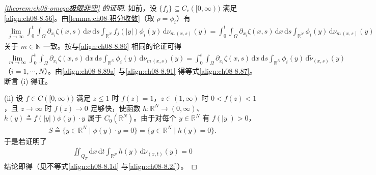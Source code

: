 \documentclass[../../main.tex]{subfiles}%
\begin{document}
\begin{proof}[\cref{theorem:ch08-omega极限非空} 的证明]
如前，设 $\{f_j\}\subseteq C_c([0,\infty))$ 满足\eqref{align:ch08-8.56}。由\cref{lemma:ch08-积分收敛}（取 $\rho=\phi_i$）有
\begin{align}
\lim_{j\to\infty}\int_0^t\int_\Omega\partial_{x_i}\zeta(x,s)\,\mathrm{d}x\,\mathrm{d}s\int_{\mathbb{R}^N}f_j(|y|)\phi_i(y)\,\mathrm{d}\nu_{m\,(x,s)}(y)
=\int_0^t\int_\Omega\partial_{x_i}\zeta(x,s)\,\mathrm{d}x\,\mathrm{d}s\int_{\mathbb{R}^N}\phi_i(y)\,\mathrm{d}\nu_{m\,(x,s)}(y) \label{align:ch08-8.90}
\end{align}
关于 $m\in\mathbb{N}$ 一致。按与\eqref{align:ch08-8.86} 相同的论证可得
\begin{align}
\lim_{m\to\infty}\int_0^t\int_\Omega\partial_{x_i}\zeta(x,s)\,\mathrm{d}x\,\mathrm{d}s\int_{\mathbb{R}^N}\phi_i(y)\,\mathrm{d}\nu_{m\,(x,s)}(y)
=\int_0^t\int_\Omega\partial_{x_i}\zeta(x,s)\,\mathrm{d}x\,\mathrm{d}s\int_{\mathbb{R}^N}\phi_i(y)\,\mathrm{d}\tilde\nu_{(x,s)}(y) \label{align:ch08-8.91}
\end{align}
（$i=1,\cdots ,N$）。由\eqref{align:ch08-8.89a} 与\eqref{align:ch08-8.91} 得等式\eqref{align:ch08-8.87}。断言 (i) 得证。

(ii) 设 $f\in C([0,\infty))$ 满足 $z\leqslant1$ 时 $f(z)=1$，$z\in(1,\infty)$ 时 $0<f(z)<1$，且 $z\to\infty$ 时 $f(z)\to0$ 足够快，使函数 $h:\mathbb{R}^N\to(0,\infty)$、$h(y)\triangleq f(|y|)\phi(y)\cdot y$ 属于 $C_0(\mathbb{R}^N)$。由于对每个 $y\in\mathbb{R}^N$ 有 $f(|y|)>0$，
\begin{align*}
S\triangleq \{y\in\mathbb{R}^N\mid\phi(y)\cdot y=0\}=\{y\in\mathbb{R}^N\mid h(y)=0\}.
\end{align*}
于是若证明了
\begin{align}
\iint_{Q_T}\mathrm{d}x\,\mathrm{d}t\int_{\mathbb{R}^N}h(y)\,\mathrm{d}\tilde\nu_{(x,t)}(y)=0 \label{align:ch08-8.92}
\end{align}
结论即得（见不等式\eqref{align:ch08-8.1d} 与\eqref{align:ch08-8.2f}）。


\end{proof}
\end{document}
